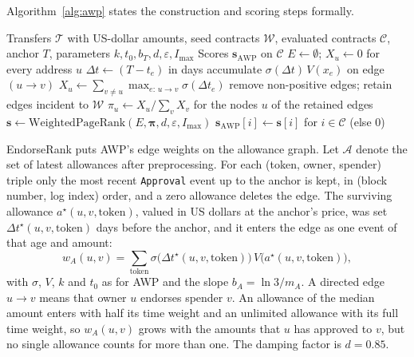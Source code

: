 Algorithm~\ref{alg:awp} states the construction and scoring steps formally.

\begin{algorithm}[htbp]
\caption{AWP graph construction and scoring}
\label{alg:awp}
\begin{algorithmic}[1]
\Require Transfers $\mathcal{T}$ with US-dollar amounts, seed contracts $\mathcal{W}$, evaluated contracts $\mathcal{C}$, anchor $T$, parameters $k,t_0,b_T,d,\varepsilon,I_{\max}$
\Ensure Scores $\mathbf{s}_{\mathrm{AWP}}$ on $\mathcal{C}$
\State $E \gets \emptyset$; $X_u\gets 0$ for every address $u$
  \State $\Delta t \gets (T-t_e)$ in days
  \State accumulate $\sigma(\Delta t)\,V(x_e)$ on edge $(u\to v)$ 
\EndFor
{}
  \State $X_u \gets \sum_{v\neq u}\max_{e:\,u\to v}\sigma(\Delta t_e)$ 
\EndFor
\State remove non-positive edges; retain edges incident to $\mathcal{W}$
\State $\pi_u \gets X_u/\sum_{v}X_v$ for the nodes $u$ of the retained edges
\State $\mathbf{s} \gets \mathrm{WeightedPageRank}(E, \boldsymbol{\pi}, d, \varepsilon, I_{\max})$ 
\State \Return $\mathbf{s}_{\mathrm{AWP}}[i] \gets \mathbf{s}[i]$ for $i\in\mathcal{C}$ (else $0$)
\end{algorithmic}
\end{algorithm}


EndorseRank puts AWP's edge weights on the allowance graph. Let $\mathcal{A}$ denote the set of latest allowances after preprocessing. For each (token, owner, spender) triple only the most recent \texttt{Approval} event up to the anchor is kept, in (block number, log index) order, and a zero allowance deletes the edge. The surviving allowance $a^{\star}(u,v,\mathrm{token})$, valued in US dollars at the anchor's price, was set $\Delta t^{\star}(u,v,\mathrm{token})$ days before the anchor, and it enters the edge as one event of that age and amount:
\begin{equation}
\label{eq:approve-weight}
w_A(u,v)
=
\sum_{\mathrm{token}}
\sigma\bigl(\Delta t^{\star}(u,v,\mathrm{token})\bigr)\,
V\bigl(a^{\star}(u,v,\mathrm{token})\bigr),
\end{equation}
with $\sigma$, $V$, $k$ and $t_0$ as for AWP and the slope $b_A=\ln 3/m_A$. A directed edge $u\to v$ means that owner $u$ endorses spender $v$. An allowance of the median amount enters with half its time weight and an unlimited allowance with its full time weight, so $w_A(u,v)$ grows with the amounts that $u$ has approved to $v$, but no single allowance counts for more than one. The damping factor is $d=0.85$.

